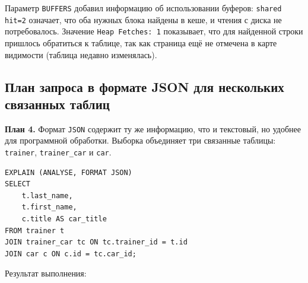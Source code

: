 \documentclass[oneside,a4paper,14pt]{extarticle}
\begin{document}
Параметр \texttt{BUFFERS} добавил информацию об использовании буферов: \texttt{shared hit=2} означает, что оба нужных блока найдены в кеше, и чтения с диска не потребовалось. Значение \texttt{Heap Fetches: 1} показывает, что для найденной строки пришлось обратиться к таблице, так как страница ещё не отмечена в карте видимости (таблица недавно изменялась).


\subsection{План запроса в формате JSON для нескольких связанных таблиц}

\textbf{План 4.} Формат \texttt{JSON} содержит ту же информацию, что и текстовый, но удобнее для программной обработки. Выборка объединяет три связанные таблицы: \texttt{trainer}, \texttt{trainer\_car} и \texttt{car}.

\begin{verbatim}
EXPLAIN (ANALYSE, FORMAT JSON)
SELECT
    t.last_name,
    t.first_name,
    c.title AS car_title
FROM trainer t
JOIN trainer_car tc ON tc.trainer_id = t.id
JOIN car c ON c.id = tc.car_id;
\end{verbatim}

Результат выполнения:
\end{document}
